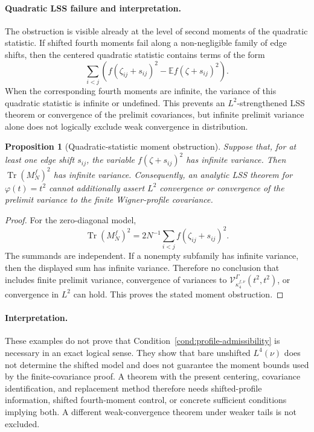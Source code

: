 \documentclass[11pt]{article}
\newtheorem{proposition}[theorem]{Proposition}
\theoremstyle{definition}
\theoremstyle{remark}
\newcommand{\E}{\mathbb E}
\newcommand{\Tr}{\operatorname{Tr}}
\begin{document}
\paragraph{Quadratic LSS failure and interpretation.}

The obstruction is visible already at the level of second moments of the
quadratic statistic.  If shifted fourth moments fail along a non-negligible
family of edge shifts, then the centered quadratic statistic contains terms
of the form
\[
        \sum_{i<j}\left( f(\zeta_{ij}+s_{ij})^2-\E f(\zeta+s_{ij})^2\right).
\]
When the corresponding fourth moments are infinite, the variance of this
quadratic statistic is infinite or undefined.  This prevents an
\(L^2\)-strengthened LSS theorem or convergence of the prelimit covariances,
but infinite prelimit variance alone does not logically exclude weak
convergence in distribution.

\begin{proposition}[Quadratic-statistic moment obstruction]
Suppose that, for at least one edge shift \(s_{ij}\), the variable
\(f(\zeta+s_{ij})^2\) has infinite variance.  Then
\(\Tr(M_N^f)^2\) has infinite variance.  Consequently, an analytic LSS
theorem for \(\varphi(t)=t^2\) cannot additionally assert \(L^2\) convergence
or convergence of the prelimit variance to the finite Wigner-profile
covariance.
\end{proposition}

\begin{proof}
For the zero-diagonal model,
\[
        \Tr (M_N^f)^2
        =2N^{-1}\sum_{i<j} f(\zeta_{ij}+s_{ij})^2.
\]
The summands are independent.  If a nonempty subfamily has infinite variance,
then the displayed sum has infinite variance.  Therefore no conclusion that
includes finite prelimit variance, convergence of variances to
\(\mathcal V_{\kappa_4^{f,\nu}}^\Gamma(t^2,t^2)\), or convergence in
\(L^2\) can hold.  This proves the stated moment obstruction.
\end{proof}

\paragraph{Interpretation.}

These examples do not prove that Condition~\ref{cond:profile-admissibility}
is necessary in an exact logical sense.  They show that bare unshifted
\(L^4(\nu)\) does not determine the shifted model and does not guarantee the
moment bounds used by the finite-covariance proof.  A theorem with the present
centering, covariance identification, and replacement method therefore needs
shifted-profile information, shifted fourth-moment control, or concrete
sufficient conditions implying both.  A different weak-convergence theorem
under weaker tails is not excluded.
\end{document}
